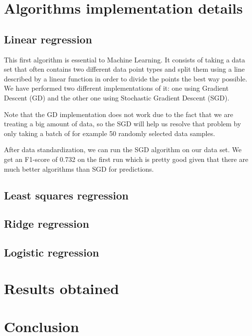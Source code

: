 \documentclass[10pt,conference,compsocconf]{IEEEtran}
\begin{document}
\section{Algorithms implementation details}
\subsection{Linear regression}
This first algorithm is essential to Machine Learning. It consists of taking a data set that often contains two different data point types and split them using a line described by a linear function in order to divide the points the best way possible. We have performed two different implementations of it: one using Gradient Descent (GD) and the other one using Stochastic Gradient Descent (SGD).\par
Note that the GD implementation does not work due to the fact that we are treating a big amount of data, so the SGD will help us resolve that problem by only taking a batch of for example 50 randomly selected data samples.\par
After data standardization, we can run the SGD algorithm on our data set. We get an F1-score of 0.732 on the first run which is pretty good given that there are much better algorithms than SGD for predictions.


\subsection{Least squares regression}

\subsection{Ridge regression}

\subsection{Logistic regression}

\section{Results obtained}

\section{Conclusion}

% 
% 
\end{document}
